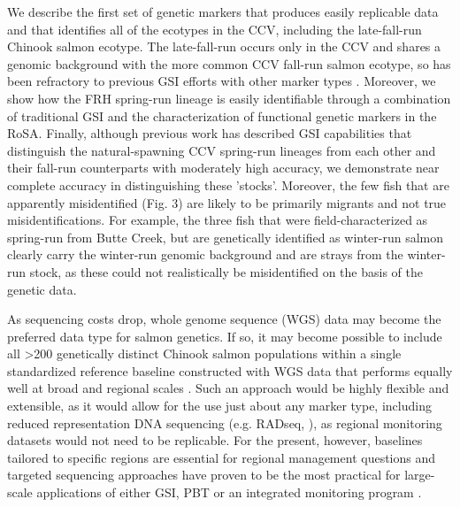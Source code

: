 We describe the first set of genetic markers that produces easily replicable data and
that identifies all of the ecotypes in the CCV, including the late-fall-run Chinook salmon ecotype.
The late-fall-run occurs only in the CCV and shares a genomic background with the more
common CCV fall-run salmon ecotype, so has been refractory to previous GSI efforts with other marker types \citep{seeb2007development,clemento2014evaluation,thompson2024genomics}. Moreover, we show how the FRH spring-run lineage is
easily identifiable through a combination of traditional GSI and the characterization
of functional genetic markers in the RoSA. Finally, although previous work has described
GSI capabilities that distinguish the natural-spawning CCV spring-run lineages from
each other and their fall-run counterparts with moderately high accuracy, we demonstrate
near complete accuracy in distinguishing these 'stocks'. Moreover, the few fish that are
apparently misidentified (Fig. 3) are likely to be primarily migrants and not true misidentifications.
For example, the three fish that were field-characterized as spring-run from Butte Creek, but are
genetically identified as winter-run salmon clearly carry the winter-run genomic background and
are strays from the winter-run stock, as these 
could not realistically be misidentified on the basis of the genetic data.


As sequencing costs drop, whole genome sequence (WGS) data may become the preferred
data type for salmon genetics. If so, it may become possible to include
all >200 genetically distinct Chinook salmon populations within a single standardized reference baseline
constructed with WGS data
that performs equally well at broad and regional scales \citep{desaixINPRESSpopulation}.
Such an approach would be highly flexible and extensible, as it would allow for the use
just about any marker type, including reduced representation DNA sequencing (e.g. RADseq,
\citealt{meek2020identifying,thompson2024genomics}),
as regional monitoring datasets would not need to be replicable.  For the present, however,
baselines tailored to specific regions are essential for regional management questions and
targeted sequencing approaches have proven to be the most practical for large-scale
applications of either GSI, PBT or an integrated monitoring program \citep{beacham2021parentage}.


